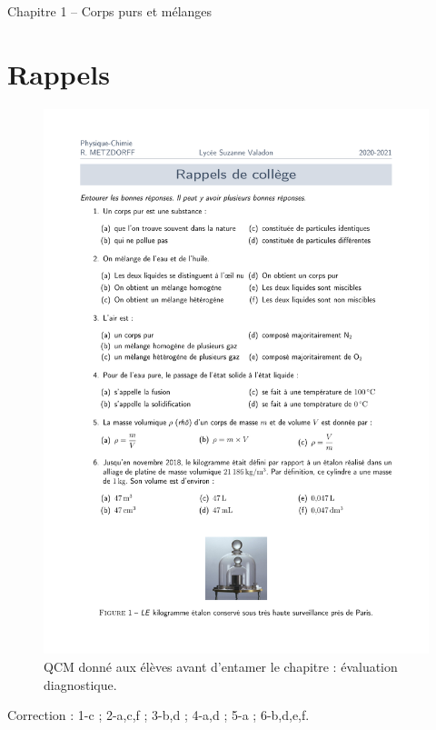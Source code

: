 



\begin{header}
Chapitre 1 -- Corps purs et mélanges
\end{header}

\section{Rappels}

\begin{figure}[h]
\center
\includegraphics[scale=0.5]{chap1_qcm_rappels.pdf}
\caption{QCM donné aux élèves avant d'entamer le chapitre : évaluation diagnostique.}
\end{figure}

Correction : 1-c ; 2-a,c,f ; 3-b,d ; 4-a,d ; 5-a ; 6-b,d,e,f.

